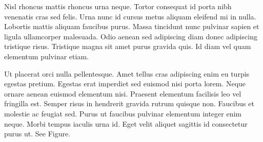 \documentclass{article}
\begin{document}
 Nisl rhoncus mattis rhoncus urna neque. Tortor consequat id porta nibh venenatis cras sed felis. Urna nunc id cursus metus aliquam eleifend mi in nulla. Lobortis mattis aliquam faucibus purus. Massa tincidunt nunc pulvinar sapien et ligula ullamcorper malesuada. Odio aenean sed adipiscing diam donec adipiscing tristique risus. Tristique magna sit amet purus gravida quis. Id diam vel quam elementum pulvinar etiam.


Ut placerat orci nulla pellentesque. Amet tellus cras adipiscing enim eu turpis egestas pretium. Egestas erat imperdiet sed euismod nisi porta lorem. Neque ornare aenean euismod elementum nisi. Praesent elementum facilisis leo vel fringilla est. Semper risus in hendrerit gravida rutrum quisque non. Faucibus et molestie ac feugiat sed. Purus ut faucibus pulvinar elementum integer enim neque. Morbi tempus iaculis urna id. Eget velit aliquet sagittis id consectetur purus ut. See Figure.
\end{document}
